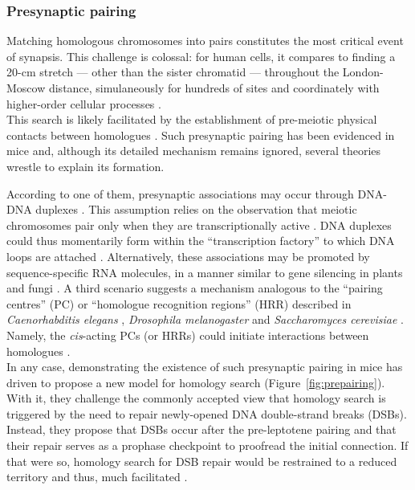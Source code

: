 \subsubsection{Presynaptic pairing}
Matching homologous chromosomes into pairs constitutes the most critical event of synapsis.
This challenge is colossal: for human cells, it compares to finding a 20-cm stretch — other than the sister chromatid — throughout the London-Moscow distance, simulaneously for hundreds of sites and coordinately with higher-order cellular processes \citep{neale2006clarifying}.\\

This search is likely facilitated by the establishment of pre-meiotic physical contacts between homologues \citep[reviewed in][]{mckee2004homologous, zickler2006early}.
Such presynaptic pairing has been evidenced in mice \citep{boateng2013homologous} and, although its detailed mechanism remains ignored, several theories wrestle to explain its formation. 

According to one of them, presynaptic associations may occur through DNA-DNA duplexes \citep{danilowicz2009single}. 
This assumption relies on the observation that meiotic chromosomes pair only when they are transcriptionally active \citep{cook1997transcriptional}. 
DNA duplexes could thus momentarily form within the “transcription factory” to which DNA loops are attached \citep{xu2008similar}.
Alternatively, these associations may be promoted by sequence-specific RNA molecules, in a manner similar to gene silencing in plants and fungi \citep[cited in \citealp{zickler2006early}]{bender2004dna}.
A third scenario suggests a mechanism analogous to the “pairing centres” (PC) or “homologue recognition regions” (HRR) described in \textit{Caenorhabditis elegans} \citep{villeneuve1994cis,macqueen2005chromosome}, \textit{Drosophila melanogaster} \citep{mckee1996license} and \textit{Saccharomyces cerevisiae} \citep{kemp2004role}.
Namely, the \textit{cis}-acting PCs (or HRRs) could initiate interactions between homologues \citep{gerton2005homologous}.\\


In any case, demonstrating the existence of such presynaptic pairing in mice has driven \citet{boateng2013homologous} to propose a new model for homology search (Figure~\ref{fig:prepairing}).
With it, they challenge the commonly accepted view that homology search is triggered by the need to repair newly-opened DNA double-strand breaks (DSBs).
Instead, they propose that DSBs occur after the pre-leptotene pairing and that their repair serves as a prophase checkpoint to proofread the initial connection.
If that were so, homology search for DSB repair would be restrained to a reduced territory and thus, much facilitated \citep{barzel2008finding,mirny2011fractal}.\\

